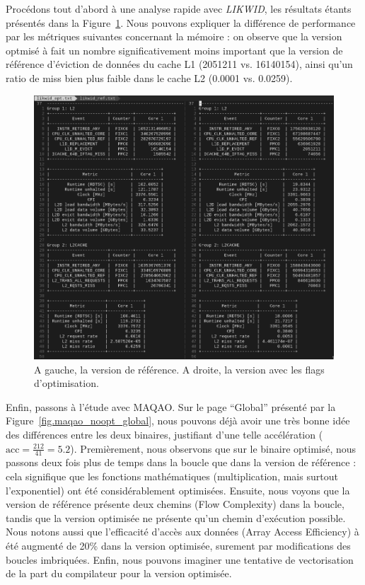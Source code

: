 \documentclass[12pt,a4paper]{article}
\begin{document}
Procédons tout d'abord à une analyse rapide avec \textit{LIKWID}, les résultats
étants présentés dans la Figure~\ref{fig.likwid_noopt}. Nous pouvons expliquer
la différence de performance par les métriques suivantes concernant la mémoire :
on observe que la version optmisé à fait un nombre significativement moins
important que la version de référence d'éviction de données du cache L1 (2051211
vs. 16140154), ainsi qu'un ratio de miss bien plus faible dans le cache L2
(0.0001 vs. 0.0259).

\begin{figure}[h]
    \centering
    \includegraphics[scale=0.45]{./figures/L1/likwid_noopt.png}
    \caption{A gauche, la version de référence. A droite, la version avec les
    flags d'optimisation.}
    \label{fig.likwid_noopt}
\end{figure}

Enfin, passons à l'étude avec MAQAO. Sur le page \enquote{Global} présenté par
la Figure~\ref{fig.maqao_noopt_global}, nous pouvons déjà avoir une très bonne
idée des différences entre les deux binaires, justifiant d'une telle
accélération ($\text{acc} = \frac{212}{41} = 5.2$). Premièrement, nous observons
que sur le binaire optimisé, nous passons deux fois plus de temps dans la boucle
que dans la version de référence : cela signifique que les fonctions
mathématiques (multiplication, mais surtout l'exponentiel) ont été
considérablement optimisées. Ensuite, nous voyons que la version de référence
présente deux chemins (Flow Complexity) dans la boucle, tandis que la version
optimisée ne présente qu'un chemin d'exécution possible. Nous notons aussi que
l'efficacité d'accès aux données (Array Access Efficiency) à été augmenté de
20\% dans la version optimisée, surement par modifications des boucles
imbriquées. Enfin, nous pouvons imaginer une tentative de vectorisation de la
part du compilateur pour la version optimisée.
\end{document}
